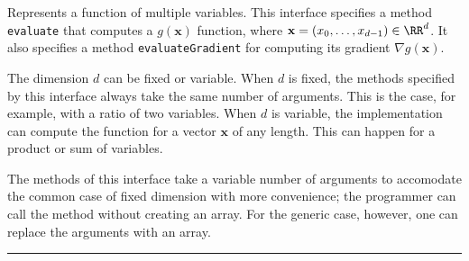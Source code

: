 
Represents a function of multiple variables.
This interface specifies a method \texttt{evaluate} that computes
a $g(\mathbf{x})$ function, where $\mathbf{x}=(x_0,\ldots,x_{d-1})\in\RR^d$.  It also specifies
a method \texttt{evaluateGradient} for computing
its gradient $\nabla g(\mathbf{x})$.

The dimension $d$ can be fixed or variable.  When $d$ is fixed, the
methods specified by this interface always take the same number of
arguments.  This is the case, for example, with a ratio of two
variables.
When $d$ is variable, the implementation can compute the
function for a vector $\mathbf{x}$ of any length.  This can happen for a
product or sum of variables.

The methods of this interface take a variable number of arguments to
accomodate the common case of fixed dimension with more convenience;
the programmer can call the method without creating an array.
For the generic case, however, one can replace the arguments with an
array.

\bigskip\hrule

